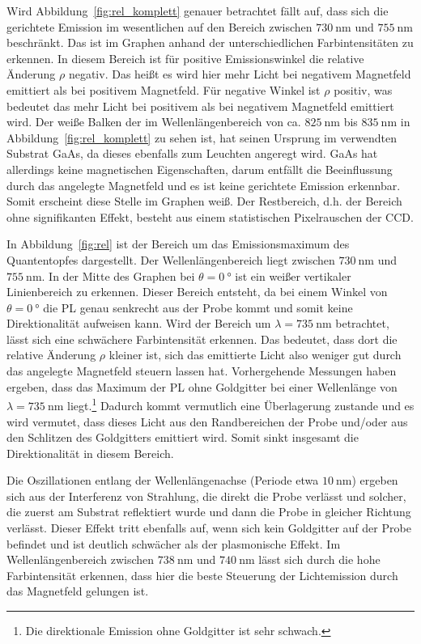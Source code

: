 Wird Abbildung~\ref{fig:rel_komplett} genauer betrachtet fällt auf, dass sich die 
gerichtete Emission im wesentlichen auf den Bereich zwischen $\SI{730}{\nano\meter}$ und $\SI{755}{\nano\meter}$
beschränkt.
Das ist im Graphen anhand der unterschiedlichen Farbintensitäten zu erkennen. 
In diesem Bereich ist für positive Emissionswinkel die relative Änderung $\rho$ negativ.
Das heißt es wird hier mehr Licht bei negativem Magnetfeld emittiert als bei positivem Magnetfeld.
Für negative Winkel ist $\rho$ positiv, was bedeutet das mehr Licht bei positivem als bei negativem Magnetfeld emittiert wird.
Der weiße Balken der im Wellenlängenbereich von ca. $\SI{825}{\nano\meter}$ bis $\SI{835}{\nano\meter}$ 
in Abbildung~\ref{fig:rel_komplett} zu sehen ist, 
hat seinen Ursprung im verwendten Substrat GaAs, 
da dieses ebenfalls zum Leuchten angeregt wird.
GaAs hat allerdings keine magnetischen Eigenschaften, 
darum entfällt die Beeinflussung durch das angelegte Magnetfeld
und es ist keine gerichtete Emission erkennbar.
Somit erscheint diese Stelle im Graphen weiß.
Der Restbereich, d.h. der Bereich ohne signifikanten Effekt, besteht aus einem statistischen Pixelrauschen der CCD.

In Abbildung~\ref{fig:rel} ist der Bereich um das Emissionsmaximum des Quantentopfes dargestellt.
Der Wellenlängenbereich liegt zwischen $\SI{730}{\nano\meter}$ und $\SI{755}{\nano\meter}$.
In der Mitte des Graphen bei $\theta = \SI{0}{\degree}$ ist ein weißer vertikaler Linienbereich zu erkennen.
Dieser Bereich entsteht, da bei einem Winkel von $\theta = \SI{0}{\degree}$ die PL genau senkrecht aus der Probe kommt
und somit keine Direktionalität aufweisen kann.
Wird der Bereich um  $\lambda = \SI{735}{\nano\meter}$ betrachtet, 
lässt sich eine schwächere Farbintensität erkennen.
Das bedeutet, dass dort die relative Änderung $\rho$ kleiner ist, sich das emittierte Licht also
weniger gut durch das angelegte Magnetfeld steuern lassen hat.
Vorhergehende Messungen haben ergeben, dass das Maximum der PL ohne Goldgitter bei 
einer Wellenlänge von $\lambda = \SI{735}{\nano\meter}$ liegt.\footnote{Die direktionale Emission ohne Goldgitter
ist sehr schwach.}
Dadurch kommt vermutlich eine Überlagerung zustande und 
es wird vermutet, dass dieses Licht aus den Randbereichen der Probe und/oder aus den Schlitzen des Goldgitters 
emittiert wird. 
Somit sinkt insgesamt die Direktionalität in diesem Bereich.

Die Oszillationen entlang der Wellenlängenachse (Periode etwa $\SI{10}{\nano\meter}$) 
ergeben sich aus der Interferenz von Strahlung, die direkt die Probe verlässt und solcher, 
die zuerst am Substrat reflektiert wurde und dann die Probe in gleicher Richtung verlässt. 
Dieser Effekt tritt ebenfalls auf, 
wenn sich kein Goldgitter auf der Probe befindet und ist deutlich schwächer als der plasmonische Effekt.\cite{lars}
Im Wellenlängenbereich zwischen $\SI{738}{\nano\meter}$ und $\SI{740}{\nano\meter}$ lässt sich durch die hohe
Farbintensität erkennen, dass hier die beste Steuerung der Lichtemission durch das Magnetfeld gelungen ist.


